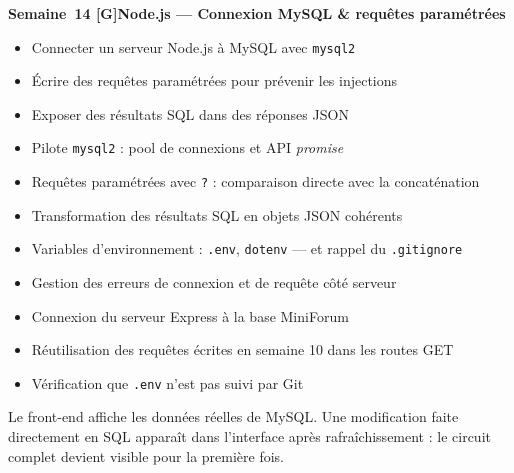 \documentclass[a4paper,11pt]{article}
\newcommand{\semainetitre}[4]{%
  \needspace{9\baselineskip}%
  \vspace{8pt}
  \noindent
  \begin{tcolorbox}[
    enhanced, colback=cfptBlack, colframe=cfptBlack,
    boxrule=0pt, arc=3pt, boxsep=0pt,
    left=8pt, right=90pt, top=4pt, bottom=4pt,
    overlay={%
      \node[anchor=east, fill=cfptYellow, text=cfptBlack,
            rounded corners=2pt, inner xsep=6pt, inner ysep=3pt,
            font=\scriptsize\bfseries]
        at ([xshift=-6pt]frame.east) {#3};}
  ]
  \color{white}\bfseries\small Semaine~#1 \quad\textcolor{cfptYellow}{[#4]}\quad #2
  \end{tcolorbox}
  \vspace{-4pt}
}
\newcommand{\contenutitre}[1]{%
  \vspace{4pt}
  \noindent{\small\color{accentBlue}\textbf{#1}}\vspace{2pt}
}
\begin{document}
\semainetitre{14}{Node.js --- Connexion MySQL \& requêtes paramétrées}{3h cours / 4h TP}{G}
\begin{tcolorbox}[semaine]
\begin{tcolorbox}[objectifs]
\begin{itemize}
  \item Connecter un serveur Node.js à MySQL avec \texttt{mysql2}
  \item Écrire des requêtes paramétrées pour prévenir les injections
  \item Exposer des résultats SQL dans des réponses JSON
\end{itemize}
\end{tcolorbox}
\vspace{4pt}
\contenutitre{Cours}
\begin{itemize}
  \item Pilote \texttt{mysql2} : pool de connexions et API \textit{promise}
  \item Requêtes paramétrées avec \texttt{?} : comparaison directe avec la concaténation
  \item Transformation des résultats SQL en objets JSON cohérents
  \item Variables d'environnement : \texttt{.env}, \texttt{dotenv} --- et rappel du \texttt{.gitignore}
  \item Gestion des erreurs de connexion et de requête côté serveur
\end{itemize}
\contenutitre{Travaux pratiques}
\begin{itemize}
  \item Connexion du serveur Express à la base MiniForum
  \item Réutilisation des requêtes écrites en semaine 10 dans les routes GET
  \item Vérification que \texttt{.env} n'est pas suivi par Git
\end{itemize}
\end{tcolorbox}
\begin{tcolorbox}[filrouge={Les vraies données arrivent dans le navigateur}]
\small Le front-end affiche les données réelles de MySQL. Une modification faite directement en SQL apparaît dans l'interface après rafraîchissement : le circuit complet devient visible pour la première fois.
\end{tcolorbox}
\end{document}
